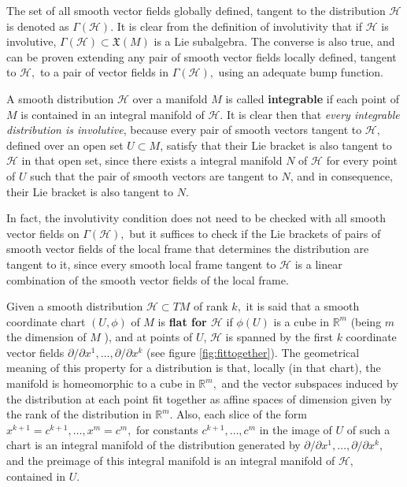 \documentclass[12pt, letterpaper, reqno]{amsart}
\theoremstyle{definition}
\theoremstyle{plain}
\theoremstyle{remark}
\begin{document}
The set of all smooth vector fields  globally defined, tangent to the distribution $ \mathcal{H} $ is denoted as $ \Gamma( \mathcal{H}) $. It is clear from the definition of involutivity that if $ \mathcal{H} $ is involutive, $ \Gamma (\mathcal{H})\subset \mathfrak{X}(M) $ is a Lie subalgebra. The converse is also true, and can be proven extending any pair of smooth vector fields locally defined, tangent to $ \mathcal{H} ,$ to a pair of vector fields in $ \Gamma( \mathcal{H}), $ using an adequate bump function. 

A smooth distribution $ \mathcal{H} $ over a manifold $ M $ is called \textbf{integrable} if each point of $ M $ is contained in an integral manifold of $ \mathcal{H}. $  It is clear then that \textit{every integrable distribution is involutive}, because every pair of smooth vectors tangent to $ \mathcal{H}, $ defined over an open set $ U\subset M $, satisfy that their Lie bracket is also tangent to $ \mathcal{H} $ in that open set, since there exists a integral manifold $ N $  of $ \mathcal{H} $ for every point of $ U $ such that the pair of smooth vectors are tangent to $ N $, and in consequence, their Lie bracket is also tangent to $ N. $  

In fact, the involutivity condition does not need to be checked with all smooth vector fields on $ \Gamma( \mathcal{H}), $ but it suffices to check if the Lie brackets of pairs of smooth vector fields of the local frame that determines the distribution are tangent to it, since every smooth local frame tangent to $ \mathcal{H} $ is a linear combination of the smooth vector fields of the local frame. 

Given a smooth distribution $ \mathcal{H}\subset TM $  of rank $ k, $ it is said that a smooth coordinate chart $ (U,\phi) $ of $ M $ is \textbf{flat for $ \mathcal{H} $ } if $ \phi(U) $ is a cube in $ \mathbb{R}^m  $ (being $ m $ the dimension of $ M $ ), and at points of $ U $, $ \mathcal{H} $ is spanned by the first $ k $ coordinate vector fields $ \partial/\partial x^1,\dots,\partial/\partial x^k $ (see figure \ref{fig:fittogether}). The geometrical meaning of this property for a distribution is that, locally (in that chart), the manifold is homeomorphic to a cube in $ \mathbb{R}^m,  $ and the vector subspaces induced by the distribution at each point fit together as affine spaces of dimension given by the rank of the distribution in $ \mathbb{R}^m $. Also, each slice of the form $ x^{k+1}=c^{k+1},\dots, x^m=c^m,$ for constants $ c^{k+1}, \dots, c^m $ in the image of $ U $ of such a chart is an integral manifold of the distribution generated by $ \partial/\partial x^1,\dots,\partial/\partial x^k $, and the preimage of this integral manifold is an integral manifold of $ \mathcal{H}, $ contained in $ U. $  
\end{document}
